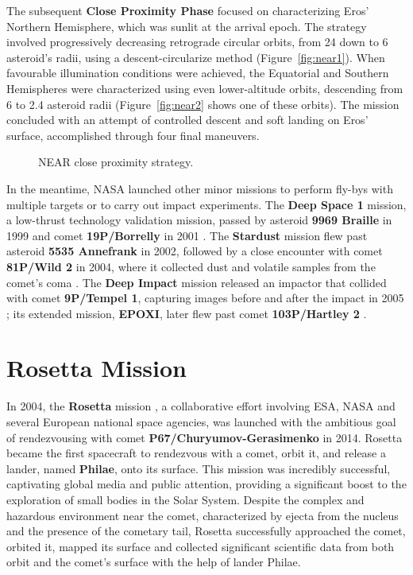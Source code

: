 \documentclass{Configuration_gigi/PoliMi3i_thesis}
\begin{document}
The subsequent \textbf{Close Proximity Phase} focused on characterizing Eros' Northern Hemisphere, which was sunlit at the arrival epoch. The strategy involved progressively decreasing retrograde circular orbits, from 24 down to 6 asteroid's radii, using a descent-circularize method (Figure~\ref{fig:near1}). When favourable illumination conditions were achieved, the Equatorial and Southern Hemispheres were characterized using even lower-altitude orbits, descending from 6 to 2.4 asteroid radii (Figure~\ref{fig:near2} shows one of these orbits). The mission concluded with an attempt of controlled descent and soft landing on Eros' surface, accomplished through four final maneuvers.

\begin{figure}[H]
    \centering
    \quad
    \caption[NEAR proximity operations.]{NEAR close proximity strategy.}
    \label{fig:near}
\end{figure}

In the meantime, NASA launched other minor missions to perform fly-bys with multiple targets or to carry out impact experiments. The \textbf{Deep Space 1} mission, a low-thrust technology validation mission, passed by asteroid \textbf{9969 Braille} in 1999 and comet \textbf{19P/Borrelly} in 2001 \cite{deepspace1}. The \textbf{Stardust} mission flew past asteroid \textbf{5535 Annefrank} in 2002, followed by a close encounter with comet \textbf{81P/Wild 2} in 2004, where it collected dust and volatile samples from the comet's coma \cite{stardust}. The \textbf{Deep Impact} mission released an impactor that collided with comet \textbf{9P/Tempel 1}, capturing images before and after the impact in 2005 \cite{deepimpact}; its extended mission, \textbf{EPOXI}, later flew past comet \textbf{103P/Hartley 2} \cite{epoxi}.


\section{Rosetta Mission}\label{Sec:Rosetta Mission}

In 2004, the \textbf{Rosetta} mission \cite{rosetta}, a collaborative effort involving ESA, NASA and several European national space agencies, was launched with the ambitious goal of rendezvousing with comet \textbf{P67/Churyumov-Gerasimenko} in 2014. Rosetta became the first spacecraft to rendezvous with a comet, orbit it, and release a lander, named \textbf{Philae}, onto its surface. This mission was incredibly successful, captivating global media and public attention, providing a significant boost to the exploration of small bodies in the Solar System. Despite the complex and hazardous environment near the comet, characterized by ejecta from the nucleus and the presence of the cometary tail, Rosetta successfully approached the comet, orbited it, mapped its surface and collected significant scientific data from both orbit and the comet's surface with the help of lander Philae. 
\end{document}
